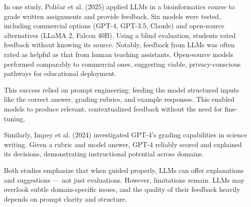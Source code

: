 \documentclass[a4paper,twoside,12pt]{report}
\begin{document}
  In one study, Poličar et al. (2025) applied LLMs in a bioinformatics course to grade written assignments and provide feedback. Six models were tested, including commercial options (GPT-4, GPT-3.5, Claude) and open-source alternatives (LLaMA 2, Falcon 40B). Using a blind evaluation, students rated feedback without knowing its source. Notably, feedback from LLMs was often rated as helpful as that from human teaching assistants. Open-source models performed comparably to commercial ones, suggesting viable, privacy-conscious pathways for educational deployment.
  
  This success relied on prompt engineering: feeding the model structured inputs like the correct answer, grading rubrics, and example responses. This enabled models to produce relevant, contextualized feedback without the need for fine-tuning.
  
  Similarly, Impey et al. (2024) investigated GPT-4's grading capabilities in science writing. Given a rubric and model answer, GPT-4 reliably scored and explained its decisions, demonstrating instructional potential across domains.
  
  Both studies emphasize that when guided properly, LLMs can offer explanations and suggestions — not just evaluations. However, limitations remain. LLMs may overlook subtle domain-specific issues, and the quality of their feedback heavily depends on prompt clarity and structure.
\end{document}
